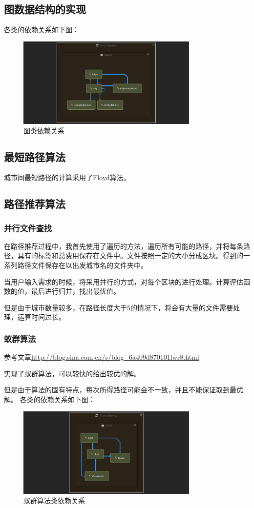 \documentclass[12pt,a4paper]{article}
\begin{document}
\subsection{图数据结构的实现}
各类的依赖关系如下图：
\begin{figure}[H]
\centering
\includegraphics[width=0.8\textwidth]{6.png}
\caption{图类依赖关系} 
\end{figure}
\subsection{最短路径算法}
城市间最短路径的计算采用了Floyd算法。
\subsection{路径推荐算法}
\subsubsection{并行文件查找}
在路径推荐过程中，我首先使用了遍历的方法，遍历所有可能的路径，并将每条路径，具有的标签和总费用保存在文件中。文件按照一定的大小分成区块。得到的一系列路径文件保存在以出发城市名的文件夹中。\par
当用户输入需求的时候，将采用并行的方式，对每个区块的进行处理。计算评估函数的值，最后进行归并，找出最优值。\par
但是由于城市数量较多，在路径长度大于5的情况下，将会有大量的文件需要处理，运算时间过长。
\subsubsection{蚁群算法}
参考文章\url{http://blog.sina.com.cn/s/blog_6a409d870101lwr8.html}\par
实现了蚁群算法，可以较快的给出较优的解。\par
但是由于算法的固有特点，每次所得路径可能会不一致，并且不能保证取到最优解。
各类的依赖关系如下图：
\begin{figure}[H]
\centering
\includegraphics[width=0.8\textwidth]{7.png}
\caption{蚁群算法类依赖关系} 
\end{figure}
\end{document}
